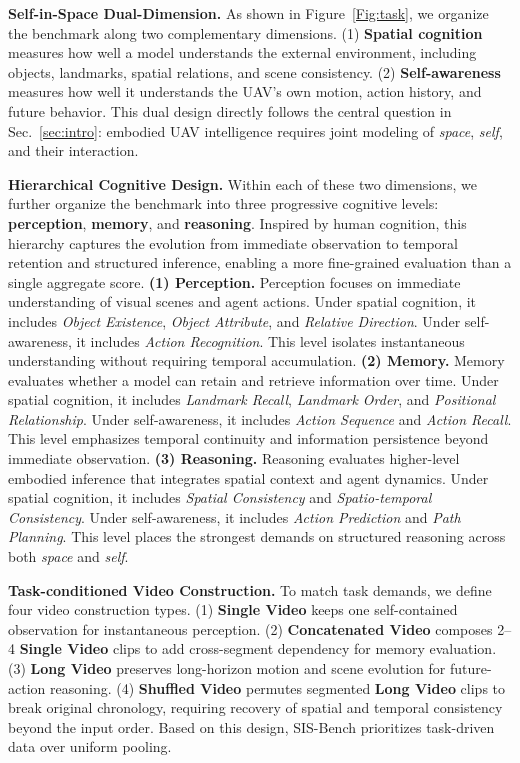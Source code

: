 \documentclass[sigconf, screen, review, anonymous]{acmart}
\begin{document}
\noindent\textbf{Self-in-Space Dual-Dimension.}
As shown in Figure~\ref{Fig:task}, we organize the benchmark along two complementary dimensions. (1) \textbf{Spatial cognition} measures how well a model understands the external environment, including objects, landmarks, spatial relations, and scene consistency. (2) \textbf{Self-awareness} measures how well it understands the UAV's own motion, action history, and future behavior. This dual design directly follows the central question in Sec.~\ref{sec:intro}: embodied UAV intelligence requires joint modeling of \emph{space}, \emph{self}, and their interaction.

\noindent\textbf{Hierarchical Cognitive Design.}
Within each of these two dimensions, we further organize the benchmark into three progressive cognitive levels: \textbf{perception}, \textbf{memory}, and \textbf{reasoning}.
Inspired by human cognition, this hierarchy captures the evolution from immediate observation to temporal retention and structured inference, enabling a more fine-grained evaluation than a single aggregate score.
\textbf{(1) Perception.}
Perception focuses on immediate understanding of visual scenes and agent actions. Under spatial cognition, it includes \textit{Object Existence}, \textit{Object Attribute}, and \textit{Relative Direction}. Under self-awareness, it includes \textit{Action Recognition}. This level isolates instantaneous understanding without requiring temporal accumulation.
\textbf{(2) Memory.}
Memory evaluates whether a model can retain and retrieve information over time. Under spatial cognition, it includes \textit{Landmark Recall}, \textit{Landmark Order}, and \textit{Positional Relationship}. Under self-awareness, it includes \textit{Action Sequence} and \textit{Action Recall}. This level emphasizes temporal continuity and information persistence beyond immediate observation.
\textbf{(3) Reasoning.}
Reasoning evaluates higher-level embodied inference that integrates spatial context and agent dynamics. Under spatial cognition, it includes \textit{Spatial Consistency} and \textit{Spatio-temporal Consistency}. Under self-awareness, it includes \textit{Action Prediction} and \textit{Path Planning}. This level places the strongest demands on structured reasoning across both \emph{space} and \emph{self}.

\noindent\textbf{Task-conditioned Video Construction.}
To match task demands, we define four video construction types. (1) \textbf{Single Video} keeps one self-contained observation for instantaneous perception. (2) \textbf{Concatenated Video} composes 2--4 \textbf{Single Video} clips to add cross-segment dependency for memory evaluation. (3) \textbf{Long Video} preserves long-horizon motion and scene evolution for future-action reasoning. (4) \textbf{Shuffled Video} permutes segmented \textbf{Long Video} clips to break original chronology, requiring recovery of spatial and temporal consistency beyond the input order. Based on this design, SIS-Bench prioritizes task-driven data over uniform pooling.
\end{document}

